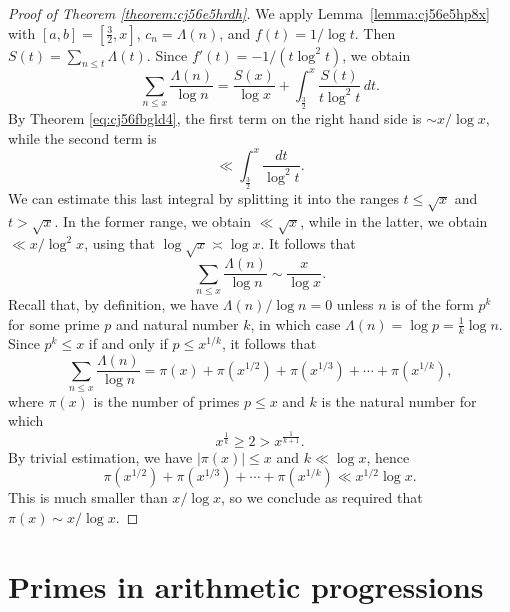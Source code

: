 \documentclass[reqno]{amsart}  \numberwithin{theorem}{section} \numberwithin{equation}{section}
\begin{document}
\begin{proof}[Proof of Theorem \ref{theorem:cj56e5hrdh}]
  We apply Lemma~\ref{lemma:cj56e5hp8x} with $[a,b] = [\tfrac{3}{2},x]$, $c_n = \Lambda(n)$, and $f(t) = 1 / \log t$.  Then $S(t) = \sum_{n \leq t} \Lambda(t)$.  Since $f'(t) = - 1 / (t \log^2 t)$, we obtain
  \begin{equation*}
    \sum_{n \leq x} \frac{\Lambda(n)}{\log n}
    = \frac{S(x)}{\log x} + \int_{\frac{3}{2}}^{x} \frac{S(t)}{t \log^2 t} \, d t.
  \end{equation*}
  By Theorem \eqref{eq:cj56fbgld4}, the first term on the right hand side is $\sim x / \log x$, while the second term is
  \begin{equation*}
    \ll \int_{\frac{3}{2}}^x \frac{d t}{\log ^2 t}.
  \end{equation*}
  We can estimate this last integral by splitting it into the ranges $t \leq \sqrt{x}$ and $t > \sqrt{x}$.  In the former range, we obtain $\ll \sqrt{x}$, while in the latter, we obtain $\ll x / \log ^2 x$, using that $\log \sqrt{x} \asymp \log x$.  It follows that
  \begin{equation*}
    \sum_{n \leq x}  \frac{\Lambda (n)}{\log n}
    \sim \frac{x}{\log x}.
  \end{equation*}
  Recall that, by definition, we have $\Lambda (n) / \log n = 0$ unless $n$ is of the form $p^k $ for some prime $p$ and natural number $k$, in which case $\Lambda (n) = \log p = \tfrac{1}{k} \log n$.  Since $p^k \leq x$ if and only if $p \leq x^{1/k}$, it follows that
  \begin{equation*}
    \sum_{n \leq x}  \frac{\Lambda (n)}{\log n}
    = \pi (x) + \pi (x^{1/2} ) + \pi (x^{1/3} ) + \dotsb + \pi (x^{1 / k}),
  \end{equation*}
  where $\pi(x)$ is the number of primes $p \leq x$ and $k$ is the natural number for which
  \begin{equation*}
    x^{\frac{1}{k}} \geq 2 > x^{\frac{1}{k + 1}}.
  \end{equation*}
  By trivial estimation, we have $\left\lvert \pi(x) \right\rvert \leq x$ and $k \ll \log x$, hence
  \begin{equation*}
    \pi (x^{1/2} ) + \pi (x^{1/3} ) + \dotsb + \pi (x^{1/k}) \ll x^{1/2} \log x.
  \end{equation*}
  This is much smaller than $x / \log x$, so we conclude as required that $\pi (x) \sim x / \log x$.
\end{proof}

\section{Primes in arithmetic progressions}\label{sec:cj578xc01a}
\end{document}
